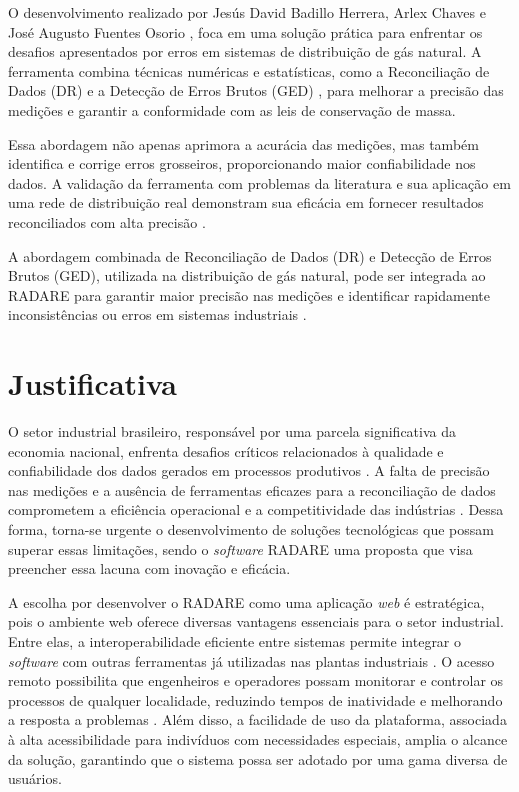O desenvolvimento realizado por Jesús David Badillo Herrera, Arlex Chaves e José Augusto Fuentes Osorio \cite{balancecontrol}, foca em uma solução prática para enfrentar os desafios apresentados por erros em sistemas de distribuição de gás natural. A ferramenta combina técnicas numéricas e estatísticas, como a Reconciliação de Dados (DR) \cite{datareconciliationtechniques} e a Detecção de Erros Brutos (GED) \cite{grosserrorcontrol}, para melhorar a precisão das medições e garantir a conformidade com as leis de conservação de massa.

Essa abordagem não apenas aprimora a acurácia das medições, mas também identifica e corrige erros grosseiros, proporcionando maior confiabilidade nos dados. A validação da ferramenta com problemas da literatura \cite{literaturevalidation} e sua aplicação em uma rede de distribuição real demonstram sua eficácia em fornecer resultados reconciliados com alta precisão \cite{precisiondatareconciliation}.

A abordagem combinada de Reconciliação de Dados (DR) e Detecção de Erros Brutos (GED), utilizada na distribuição de gás natural, pode ser integrada ao RADARE para garantir maior precisão nas medições e identificar rapidamente inconsistências ou erros em sistemas industriais \cite{industrialdataapplications}.

\section{Justificativa}

O setor industrial brasileiro, responsável por uma parcela significativa da economia nacional, enfrenta desafios críticos relacionados à qualidade e confiabilidade dos dados gerados em processos produtivos \cite{govbr}. A falta de precisão nas medições e a ausência de ferramentas eficazes para a reconciliação de dados comprometem a eficiência operacional e a competitividade das indústrias \cite{cni2024}. Dessa forma, torna-se urgente o desenvolvimento de soluções tecnológicas que possam superar essas limitações, sendo o \textit{software} RADARE uma proposta que visa preencher essa lacuna com inovação e eficácia.

A escolha por desenvolver o RADARE como uma aplicação \textit{web} é estratégica, pois o ambiente web oferece diversas vantagens essenciais para o setor industrial. Entre elas, a interoperabilidade eficiente entre sistemas permite integrar o \textit{software} com outras ferramentas já utilizadas nas plantas industriais \cite{apiimportance}. O acesso remoto possibilita que engenheiros e operadores possam monitorar e controlar os processos de qualquer localidade, reduzindo tempos de inatividade e melhorando a resposta a problemas \cite{webusage}. Além disso, a facilidade de uso da plataforma, associada à alta acessibilidade para indivíduos com necessidades especiais, amplia o alcance da solução, garantindo que o sistema possa ser adotado por uma gama diversa de usuários.

